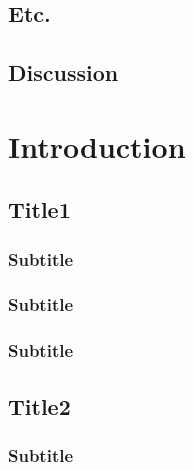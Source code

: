 \documentclass[12pt,twoside,a4paper, a]{article}
\let\oldsection\section
\renewcommand\section{\clearpage\oldsection}
\begin{document}
\lipsum[10-11]

\hypertarget{etc.}{%
\subsection{Etc.}\label{etc.}}

\hypertarget{discussion}{%
\subsection{Discussion}\label{discussion}}

\lipsum[12-14]

\hypertarget{introduction-1}{%
\section{Introduction}\label{introduction-1}}

\hypertarget{title1}{%
\subsection{Title1}\label{title1}}

\hypertarget{subtitle}{%
\subsubsection{Subtitle}\label{subtitle}}

\lipsum[1]

\hypertarget{subtitle-1}{%
\subsubsection{Subtitle}\label{subtitle-1}}

\lipsum[2-3]

\hypertarget{subtitle-2}{%
\subsubsection{Subtitle}\label{subtitle-2}}

\lipsum[4-6]

\hypertarget{title2}{%
\subsection{Title2}\label{title2}}

\hypertarget{subtitle-3}{%
\subsubsection{Subtitle}\label{subtitle-3}}
\end{document}
